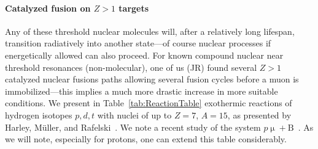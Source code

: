 \documentclass[particles,article,accept,pdftex,moreauthors]{Definitions/mdpi}
\begin{document}
\paragraph*{\bf Catalyzed fusion on $Z>1$ targets}
Any of these threshold nuclear molecules will, after a relatively long lifespan, transition radiatively into another state---of course nuclear processes if energetically allowed can also proceed. For known compound nuclear near threshold resonances (non-molecular), one of us (JR) found several $Z>1$ catalyzed nuclear fusions paths allowing several fusion cycles before a muon is immobilized---this implies a much more drastic increase in more suitable conditions. We present in Table~\ref{tab:ReactionTable} exothermic reactions of hydrogen isotopes $p,d,t$ with nuclei of up to $Z = 7$, $A = 15$, as presented by Harley, M{\"u}ller, and Rafelski~\cite{Harley:1988wp}. We note a recent study of the system $p\upmu+\mathrm{B}$~\cite{Wang:2026zuj}. As we will note, especially for protons, one can extend this table considerably.
\end{document}
